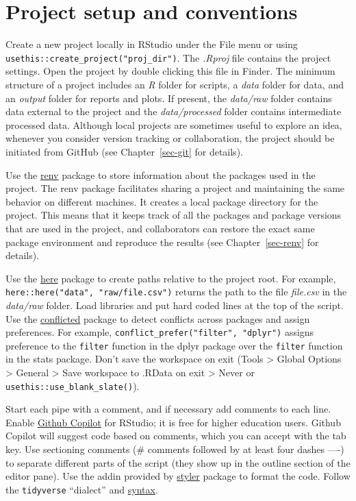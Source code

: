 \documentclass[
  letterpaper,
  DIV=11,
  numbers=noendperiod]{scrreport}
\begin{document}
\section{Project setup and
conventions}\label{project-setup-and-conventions}

Create a new project locally in RStudio under the File menu or using
\texttt{usethis::create\_project("proj\_dir")}. The \emph{.Rproj} file
contains the project settings. Open the project by double clicking this
file in Finder. The minimum structure of a project includes an \emph{R}
folder for scripts, a \emph{data} folder for data, and an \emph{output}
folder for reports and plots. If present, the \emph{data/raw} folder
contains data external to the project and the \emph{data/processed}
folder contains intermediate processed data. Although local projects are
sometimes useful to explore an idea, whenever you consider version
tracking or collaboration, the project should be initiated from GitHub
(see Chapter~\ref{sec-git} for details).

Use the \href{https://rstudio.github.io/renv/articles/renv.html}{renv}
package to store information about the packages used in the project. The
renv package facilitates sharing a project and maintaining the same
behavior on different machines. It creates a local package directory for
the project. This means that it keeps track of all the packages and
package versions that are used in the project, and collaborators can
restore the exact same package environment and reproduce the results
(see Chapter~\ref{sec-renv} for details).

Use the \href{https://here.r-lib.org}{here} package to create paths
relative to the project root. For example,
\texttt{here::here("data",\ "raw/file.csv")} returns the path to the
file \emph{file.csv} in the \emph{data/raw} folder. Load libraries and
put hard coded lines at the top of the script. Use the
\href{https://conflicted.r-lib.org}{conflicted} package to detect
conflicts across packages and assign preferences. For example,
\texttt{conflict\_prefer("filter",\ "dplyr")} assigns preference to the
\texttt{filter} function in the dplyr package over the \texttt{filter}
function in the stats package. Don't save the workspace on exit (Tools
\textgreater{} Global Options \textgreater{} General \textgreater{} Save
workspace to .RData on exit \textgreater{} Never or
\texttt{usethis::use\_blank\_slate()}).

Start each pipe with a comment, and if necessary add comments to each
line. Enable
\href{https://docs.posit.co/ide/user/ide/guide/tools/copilot.html}{Github
Copilot} for RStudio; it is free for higher education users. Github
Copilot will suggest code based on comments, which you can accept with
the tab key. Use sectioning comments (\# comments followed by at least
four dashes ----) to separate different parts of the script (they show
up in the outline section of the editor pane). Use the addin provided by
\href{https://styler.r-lib.org}{styler} package to format the code.
Follow the \texttt{tidyverse} ``dialect'' and
\href{https://style.tidyverse.org}{syntax}.
\end{document}
